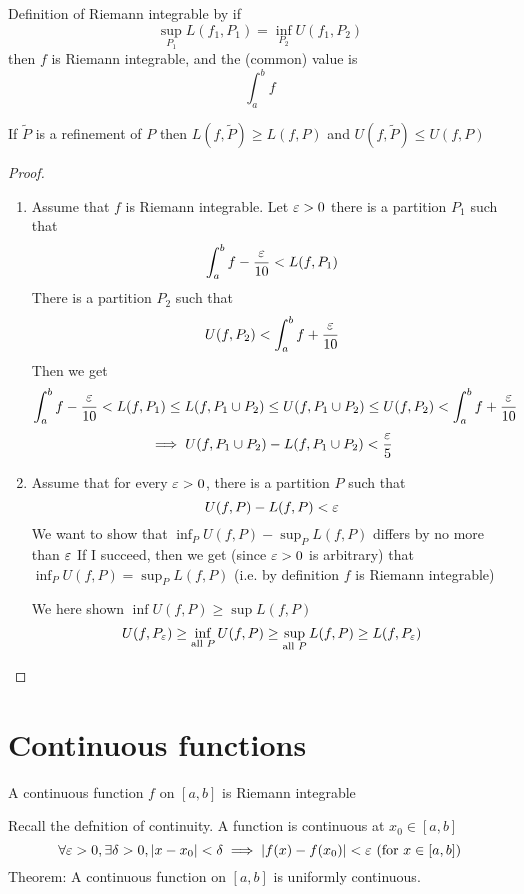 Definition of Riemann integrable by if
$$\sup_{P_1} L(f_1, P_1) = \inf_{P_2} U(f_1, P_2)$$
then $f$ is Riemann integrable, and the (common) value is $$\int_{a}^{b}f $$

If $\tilde{P}$ is a refinement of $P$ then $L(f, \tilde{P}) \geq L(f, P)$ and $U(f, \tilde{P}) \leq U(f, P)$

\begin{proof}
  \text{}
  \begin{enumerate}[1.]
    \item Assume that $f$ is Riemann integrable.
    Let $\varepsilon > 0$ there is a partition $P_1$ such that 
    $$\int_a^b f - \frac{\varepsilon}{10} < L(f, P_1)$$
    There is a partition $P_2$ such that 
    $$U(f, P_2) < \int_a^b f+ \frac{\varepsilon}{10}$$
    Then we get 
    $$\int_a^b f - \frac{\varepsilon}{10} < L(f, P_1) \leq L(f, P_1\cup P_2) \leq U(f, P_1\cup P_2) \leq U(f, P_2) < \int_a^b f+ \frac{\varepsilon}{10}$$
    $$\implies U(f, P_1 \cup P_2) - L(f, P_1 \cup P_2) < \frac{\varepsilon}{5}$$
    \item Assume that for every $\varepsilon > 0$, there is a partition $P$ such that
    $$U(f, P) - L(f, P) < \varepsilon$$
    We want to show that $\displaystyle\inf_P U(f, P) - \displaystyle\sup_P L(f, P)$ differs by no more than $\varepsilon$
    If I succeed, then we get (since $\varepsilon > 0$ is arbitrary) that 
    $\displaystyle\inf_P U(f, P) = \displaystyle\sup_P L(f, P)$
    (i.e. by definition $f$ is Riemann integrable)

    We here shown $\inf U(f, P) \geq \sup L(f, P)$
    $$U(f, P_\varepsilon) \ge \inf_{\text{all }P}U(f, P) \ge \sup _{\text{all }P}L(f, P) \ge L(f, P_\varepsilon)$$
  \end{enumerate}
\end{proof}
\section{Continuous functions}

\begin{theorem*}
  A continuous function $f$ on $[a, b]$ is Riemann integrable
\end{theorem*}

Recall the defnition of continuity.
A function is continuous at $x_0 \in [a, b]$
$$\forall \varepsilon > 0, \exists \delta > 0, |x-x_0| < \delta \implies |f(x) - f(x_0)| < \varepsilon\ (\text{for }x \in [a, b])$$
Theorem: A continuous function on $[a, b]$ is uniformly continuous.

